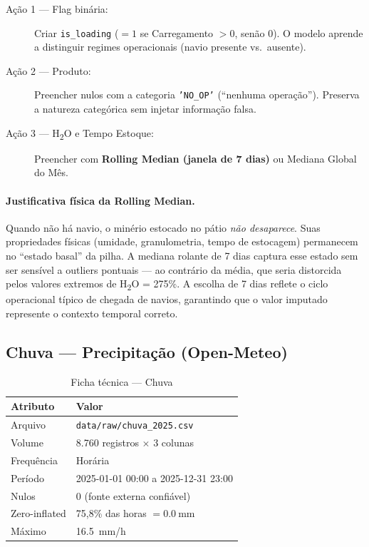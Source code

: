 \documentclass[12pt, a4paper]{article}
\newcommand{\feature}[1]{\texttt{#1}}
\newcommand{\arquivo}[1]{\texttt{#1}}
\begin{document}
\begin{description}
    \item[Ação 1 — Flag binária:] Criar \feature{is\_loading}
          ($= 1$ se Carregamento $> 0$, senão $0$). O modelo aprende a
          distinguir regimes operacionais (navio presente vs.\ ausente).

    \item[Ação 2 — Produto:] Preencher nulos com a categoria
          \texttt{'NO\_OP'} (``nenhuma operação''). Preserva a natureza
          categórica sem injetar informação falsa.

    \item[Ação 3 — H\textsubscript{2}O e Tempo Estoque:] Preencher com
          \textbf{Rolling Median (janela de 7 dias)} ou Mediana Global do
          Mês.
\end{description}

\paragraph{Justificativa física da Rolling Median.}
Quando não há navio, o minério estocado no pátio \textit{não desaparece}.
Suas propriedades físicas (umidade, granulometria, tempo de estocagem)
permanecem no ``estado basal'' da pilha. A mediana rolante de 7 dias captura
esse estado sem ser sensível a outliers pontuais — ao contrário da média,
que seria distorcida pelos valores extremos de H\textsubscript{2}O = 275\%.
A escolha de 7 dias reflete o ciclo operacional típico de chegada de navios,
garantindo que o valor imputado represente o contexto temporal correto.

\subsection{Chuva — Precipitação (Open-Meteo)}
\label{subsec:chuva}

\begin{table}[H]
\centering
\caption{Ficha técnica — Chuva}
\label{tab:chuva_ficha}
\begin{tabular}{@{}ll@{}}
\toprule
\textbf{Atributo}       & \textbf{Valor} \\
\midrule
Arquivo                  & \arquivo{data/raw/chuva\_2025.csv} \\
Volume                   & 8.760 registros $\times$ 3 colunas \\
Frequência               & Horária \\
Período                  & 2025-01-01 00:00 a 2025-12-31 23:00 \\
Nulos                    & 0 (fonte externa confiável) \\
Zero-inflated            & 75,8\% das horas $= \SI{0,0}{\milli\metre}$ \\
Máximo                   & \SI{16,5}{\milli\metre/\hour} \\
\bottomrule
\end{tabular}
\end{table}
\end{document}

